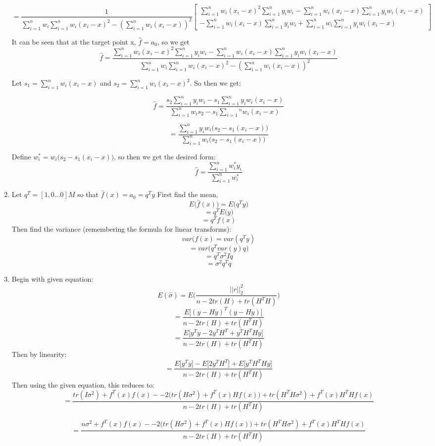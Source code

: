 \documentclass[10pt]{article}
\begin{document}
\begin{enumerate}[label=(\Alph*)]
        $$=\frac{1}{\sum_{i=1}^nw_i \sum_{i=1}^nw_i(x_i-x)^2 - (\sum_{i=1}^nw_i (x_i-x))^2}
        \begin{bmatrix}
        \sum_{i=1}^nw_i(x_i-x)^2\sum_{i=1}^ny_iw_i - \sum_{i=1}^nw_i(x_i-x)\sum_{i=1}^ny_iw_i(x_i-x) \\
        -\sum_{i=1}^nw_i(x_i-x)\sum_{i=1}^ny_iw_i+\sum_{i=1}^nw_i\sum_{i=1}^ny_iw_i(x_i-x)
        \end{bmatrix}$$

        It can be seen that at the target point x, $\hat{f} = a_0$, so we get 
        $$\hat{f} =  \frac{\sum_{i=1}^nw_i(x_i-x)^2\sum_{i=1}^ny_iw_i - \sum_{i=1}^nw_i(x_i-x)\sum_{i=1}^ny_iw_i(x_i-x)}{\sum_{i=1}^nw_i \sum_{i=1}^nw_i(x_i-x)^2 - (\sum_{i=1}^nw_i (x_i-x))^2}$$

        Let $s_1 = \sum_{i=1}^nw_i(x_i-x)$ and $s_2 = \sum_{i=1}^nw_i(x_i-x)^2$. So then we get:

        $$\hat{f} = \frac{s_2\sum_{i=1}^ny_iw_i-s_1\sum_{i=1}^ny_iw_i(x_i-x)}{\sum_{i=1}^nw_is_2 - s_1\sum_{i=1}\textbf{}^nw_i(x_i-x)}$$

        $$= \frac{\sum_{i=1}^ny_iw_i\big(s_2-s_1(x_i-x)\big)}{\sum_{i=1}^nw_i\big(s_2-s_1(x_i-x)\big)}$$

        Define $w_i^* = w_i\big(s_2 - s_1(x_i-x)\big)$, so then we get the desired form:
        $$\hat{f} = \frac{\sum_{i=1}^nw_i^*y_i}{\sum_{i=1}^nw_i^*}$$
        \item
        Let $q^T=[1,0...0]M$ so that $\hat{f}(x)=a_0=q^Ty$ First find the mean, 
        $$E\big(\hat{f}(x)\big) = E\big(q^Ty\big)$$
        $$=q^T E\big(y\big)$$
        $$ = q^Tf(x)$$
        Then find the variance (remembering the formula for linear transforms):
        $$var(\hat{f}(x) = var(q^Ty)$$
        $$=var\big(q^Tvar(y)q\big)$$
        $$=q^T\sigma^2Iq$$
        $$=\sigma^2q^Tq$$

        \item
        Begin with given equation:
        $$E(\hat{\sigma}) = E\bigg(\frac{||r||_2^2}{n-2tr(H)+tr(H^TH)}\bigg)$$
        $$=\frac{E\bigg[ (y-Hy)^T(y-Hy) \bigg]}{n-2tr(H)+tr(H^TH)}$$
        $$=\frac{E\bigg[y^Ty-2y^TH^T+y^TH^THy\bigg]}{n-2tr(H)+tr(H^TH)}$$
        Then by linearity:
        $$=\frac{E\bigg[y^Ty\bigg]-E\bigg[2y^TH^T\bigg]+E\bigg[y^TH^THy\bigg]}{n-2tr(H)+tr(H^TH)}$$
        Then using the given equation, this reduces to:
        $$=\frac{tr(I\sigma^2)+f^T(x)f(x)--2\bigg(tr(H\sigma^2)+f^T(x)Hf(x)\bigg)+tr(H^TH\sigma^2)+f^T(x)H^THf(x)}{n-2tr(H)+tr(H^TH)}$$

        $$=\frac{n\sigma^2+f^T(x)f(x)--2\bigg(tr(H\sigma^2)+f^T(x)Hf(x)\bigg)+tr(H^TH\sigma^2)+f^T(x)H^THf(x)}{n-2tr(H)+tr(H^TH)}$$


\end{enumerate}
\end{document}
